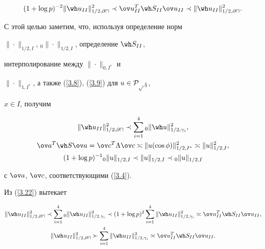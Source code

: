 \begin{pf}
\begin{equation}
(1+\log p)^{-2}\|\h_{II}\|_{1/2,\partial\sqcap}^2


\prec\ov u_{II}^T \wh S_{II}\ov u_{II}


\prec\|\h_{II}\|_{1/2,\partial\sqcap}^2.


\label{3.15}


\end{equation}


С этой целью заметим, что, используя определение норм


$\|\cdot\|_{1/2,I}$, ${}_0\|\cdot\|_{1/2,I}$, определение $\s$,


интерполирование между $\|\cdot\|_{0,I^*}$ и


$\|\cdot\|_{1,I^*}$, а также (\ref{3.8}), (\ref{3.9}) для $u\in\cal P_{p,x}$,


$x\in I$, получим


\begin{gather}


\|\h_{II}\|_{1/2,\partial\sqcap}^2\prec


\sum_{i=1}^4{}_0\|\h\|_{1/2,\gamma_i}^2,\notag\\


\label{3.22}


\ov a^T\wh S\ov a=\ov c^T\Lambda\ov c\asymp


\|u(\cos\phi)\|_{1/2,I^*}^2\asymp\|u\|_{1/2,I}^2,\\


(1+\log p)^{-1}{}_0\|u\|_{1/2,I}\prec\|u\|_{1/2,I}


\prec{}_0\|u\|_{1/2,I}\notag


\end{gather}


с $\ov a$, $\ov c$, соответствующими (\ref{3.4}).


Из (\ref{3.22}) вытекает


\begin{gather*}


\|\h_{II}\|_{1/2,\partial\sqcap}^2\prec


\sum_{i=1}^4{}_0\|\h_{II}\|_{1/2,\gamma_i}^2\prec(1+\log p)^2


\sum_{i=1}^4\|\h_{II}\|_{1/2,\gamma_i}^2


\asymp\ov u_{II}^T\wh S_{II}\ov u_{II},\\


\|\h_{II}\|_{1/2,\partial\sqcap}^2\succ


\sum_{i=1}^4\|\h_{II}\|_{1/2,\gamma_i}^2


\asymp\ov u_{II}^T\wh S_{II}\ov u_{II}.



\end{gather*}
\end{pf}
